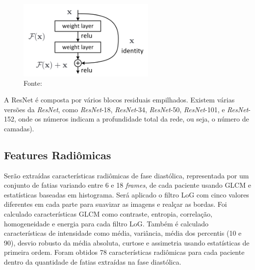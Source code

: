 \begin{figure}[htbp]
    \centering
    \includegraphics[width=0.6\textwidth]{figures/fig013.png}
    \caption{Fonte: \cite{aiSelfAttentionBasedFusion2023}}
    \label{fig:fig013}
\end{figure}

A ResNet é composta por vários blocos residuais empilhados.
Existem várias versões da \textit{ResNet}, como \textit{ResNet}-18, \textit{ResNet}-34, \textit{ResNet}-50, \textit{ResNet}-101, e \textit{ResNet}-152, onde os números indicam a profundidade total da rede, ou seja, o número de camadas).

\subsection{Features Radiômicas}
\label{subsec:cap4_features_radiomicas}

Serão extraídas características radiômicas de fase diastólica, representada por um conjunto de fatias variando entre 6 e 18 \textit{frames}, de cada paciente usando \gls{GLCM} e estatísticas baseadas em histograma. Será aplicado o filtro \gls{LoG} com cinco valores diferentes em cada parte para suavizar as imagens e realçar as bordas. Foi calculado características \gls{GLCM} como contraste, entropia, correlação, homogeneidade e energia para cada filtro \gls{LoG}. Também é calculado características de intensidade como média, variância, média dos percentis (10 e 90), desvio robusto da média absoluta, curtose e assimetria usando estatísticas de primeira ordem. Foram obtidos 78 características radiômicas para cada paciente dentro da quantidade de fatias extraídas na fase diastólica.

